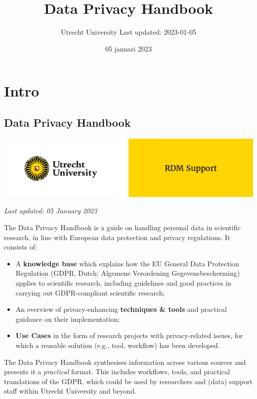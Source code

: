 \documentclass[
]{book}
\title{Data Privacy Handbook}
\author{Utrecht University \textbar{} Last updated: 2023-01-05}
\date{05 januari 2023}
\providecommand{\tightlist}{%
  \setlength{\itemsep}{0pt}\setlength{\parskip}{0pt}}
\begin{document}
\maketitle

{
\setcounter{tocdepth}{1}
\tableofcontents
}
\hypertarget{part-intro}{%
\part*{Intro}\label{part-intro}}

\hypertarget{data-privacy-handbook}{%
\chapter*{Data Privacy Handbook}\label{data-privacy-handbook}}

\includegraphics{img/cover-image-dph.png}

\emph{Last updated: 05 January 2023}

The Data Privacy Handbook is a guide on handling personal data in scientific
research, in line with European data protection and privacy regulations. It
consists of:

\begin{itemize}
\tightlist
\item
  A \textbf{knowledge base} which explains how the EU General Data Protection
  Regulation (GDPR, Dutch: Algemene Verordening Gegevensbescherming) applies to
  scientific research, including guidelines and good practices in carrying out
  GDPR-compliant scientific research;
\item
  An overview of privacy-enhancing \textbf{techniques \& tools} and practical guidance
  on their implementation;
\item
  \textbf{Use Cases} in the form of research projects with privacy-related issues,
  for which a reusable solution (e.g., tool, workflow) has been developed.
\end{itemize}

The Data Privacy Handbook synthesises information across various sources and
presents it a \emph{practical} format. This includes workflows, tools, and practical
translations of the GDPR, which could be used by researchers and (data) support
staff within Utrecht University and beyond.
\end{document}
